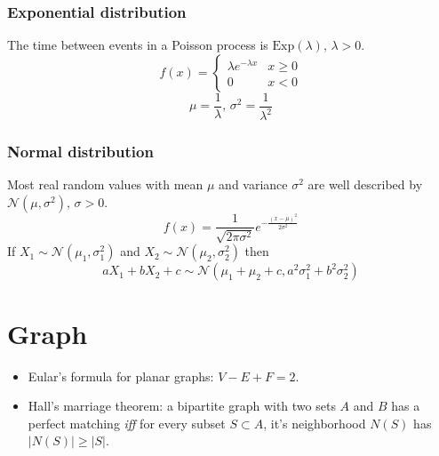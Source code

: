 \subsubsection{Exponential distribution}
The time between events in a Poisson process is $\textrm{Exp}(\lambda),\,\lambda>0$.
\[f(x) = \left\{
\begin{array}{cl}
\lambda e^{-\lambda x} & x\geq0\\
0 & x<0
\end{array}\right.\]
\[\mu=\frac{1}{\lambda},\,\sigma^2=\frac{1}{\lambda^2}\]

\subsubsection{Normal distribution}
Most real random values with mean $\mu$ and variance $\sigma^2$ are well described by $\mathcal{N}(\mu,\sigma^2),\,\sigma>0$.
\[ f(x) = \frac{1}{\sqrt{2\pi\sigma^2}}e^{-\frac{(x-\mu)^2}{2\sigma^2}} \]
If $X_1 \sim \mathcal{N}(\mu_1,\sigma_1^2)$ and $X_2 \sim \mathcal{N}(\mu_2,\sigma_2^2)$ then
\[ aX_1 + bX_2 + c \sim \mathcal{N}(\mu_1+\mu_2+c,a^2\sigma_1^2+b^2\sigma_2^2) \]

\section{Graph}
\begin{itemize}
  \item Eular's formula for planar graphs: $V - E + F = 2$.
  \item Hall's marriage theorem: a bipartite graph with two sets $A$ and $B$ has a perfect matching \textit{iff} for every subset $S \subset A$, it's neighborhood $N(S)$ has $|N(S)| \geq |S|$.
\end{itemize}


